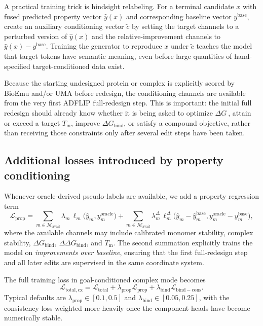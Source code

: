 \documentclass[11pt]{article}
\newcommand{\dG}{\ensuremath{\Delta G \ }}
\newcommand{\Tm}{\ensuremath{T_{\mathrm m}}}
\newcommand{\DGbind}{\ensuremath{\Delta G_{\mathrm{bind}}}}
\newcommand{\DDGbind}{\ensuremath{\Delta\Delta G_{\mathrm{bind}}}}
\begin{document}
	A practical training trick is hindsight relabeling. For a terminal candidate $x$ with fused predicted property vector $\widehat y(x)$ and corresponding baseline vector $y^{\mathrm{base}}$, create an auxiliary conditioning vector $\widetilde c$ by setting the target channels to a perturbed version of $\widehat y(x)$ and the relative-improvement channels to $\widehat y(x)-y^{\mathrm{base}}$. Training the generator to reproduce $x$ under $\widetilde c$ teaches the model that target tokens have semantic meaning, even before large quantities of hand-specified target-conditioned data exist.
	
	Because the starting undesigned protein or complex is explicitly scored by BioEmu and/or UMA before redesign, the conditioning channels are available from the very first ADFLIP full-redesign step. This is important: the initial full redesign should already know whether it is being asked to optimize \dG, attain or exceed a target \Tm, improve \DGbind, or satisfy a compound objective, rather than receiving those constraints only after several edit steps have been taken.
	
	
	
	\subsection{Additional losses introduced by property conditioning}
	
	Whenever oracle-derived pseudo-labels are available, we add a property regression term
	\begin{equation}
		\label{eq:proploss}
		\mathcal{L}_{\mathrm{prop}} = \sum_{m\in\mathcal{M}_{\mathrm{avail}}} \lambda_m\,\ell_m\!\big(\widehat y_m, y_m^{\mathrm{oracle}}\big)
		+
		\sum_{m\in\mathcal{M}_{\mathrm{avail}}} \lambda_m^{\Delta}\,\ell_m^{\Delta}\!\big(\widehat y_m-\widehat y_m^{\mathrm{base}}, y_m^{\mathrm{oracle}}-y_m^{\mathrm{base}}\big),
	\end{equation}
	where the available channels may include calibrated monomer stability, complex stability, \DGbind, \DDGbind, and \Tm. The second summation explicitly trains the model on \emph{improvements over baseline}, ensuring that the first full-redesign step and all later edits are supervised in the same coordinate system.
	
	The full training loss in goal-conditioned complex mode becomes
	\begin{equation}
		\label{eq:totallosscx}
		\mathcal{L}_{\mathrm{total,cx}} = \mathcal{L}_{\mathrm{total}} + \lambda_{\mathrm{prop}}\mathcal{L}_{\mathrm{prop}} + \lambda_{\mathrm{bind}}\mathcal{L}_{\mathrm{bind-cons}}.
	\end{equation}
	Typical defaults are $\lambda_{\mathrm{prop}}\in[0.1,0.5]$ and $\lambda_{\mathrm{bind}}\in[0.05,0.25]$, with the consistency loss weighted more heavily once the component heads have become numerically stable.
	
\end{document}
